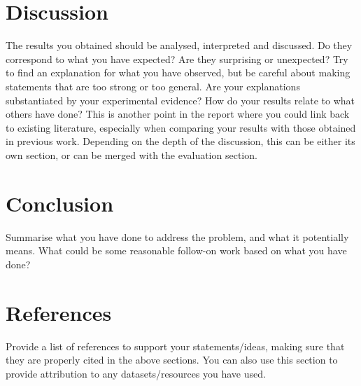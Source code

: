 \documentclass[11pt]{article}
\begin{document}
\section{Discussion}
The results you obtained should be analysed, interpreted and discussed. Do they correspond to what you have expected? Are they surprising or unexpected? Try to find an explanation for what you have observed, but be careful about making statements that are too strong or too general. Are your explanations substantiated by your experimental evidence? How do your results relate to what others have done? This is another point in the report where you could link back to existing literature, especially when comparing your results with those obtained in previous work. Depending on the depth of the discussion, this can be either its own section, or can be merged with the evaluation section.

\section{Conclusion}
Summarise what you have done to address the problem, and what it potentially means. What could be some reasonable follow-on work based on what you have done? 

\section*{References}
Provide a list of references to support your statements/ideas, making sure that they are properly cited in the above sections. You can also use this section to provide attribution to any datasets/resources you have used.
\end{document}
